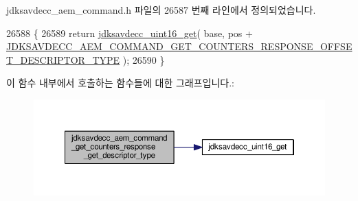jdksavdecc\+\_\+aem\+\_\+command.\+h 파일의 26587 번째 라인에서 정의되었습니다.


\begin{DoxyCode}
26588 \{
26589     \textcolor{keywordflow}{return} \hyperlink{group__endian_ga3fbbbc20be954aa61e039872965b0dc9}{jdksavdecc\_uint16\_get}( base, pos + 
      \hyperlink{group__command__get__counters__response_ga3a6ecc54be3c186574c2ba99a0fa2368}{JDKSAVDECC\_AEM\_COMMAND\_GET\_COUNTERS\_RESPONSE\_OFFSET\_DESCRIPTOR\_TYPE}
       );
26590 \}
\end{DoxyCode}


이 함수 내부에서 호출하는 함수들에 대한 그래프입니다.\+:
\nopagebreak
\begin{figure}[H]
\begin{center}
\leavevmode
\includegraphics[width=350pt]{group__command__get__counters__response_gaeb2014fe7143c09e4d7dd849dde4881f_cgraph}
\end{center}
\end{figure}




